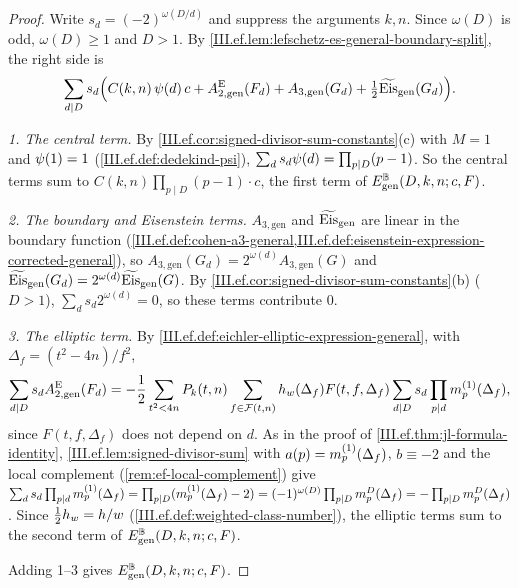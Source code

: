 \begin{theorem}
\end{theorem}
\begin{proof}
Write $s_d=(-2)^{\omega(D/d)}$ and suppress the arguments $k,n$. Since $\omega(D)$ is odd, $\omega(D)\ge1$ and $D>1$. By
\cref{III.ef.lem:lefschetz-es-general-boundary-split}, the right side is
\[
  \sum_{d\mid D}s_d\Bigl(C(k,n)\,\psi(d)\,c+A_{2,\mathrm{gen}}^{\mathrm E}(F_d)+A_{3,\mathrm{gen}}(G_d)+\tfrac12\widetilde{\mathrm{Eis}}_{\mathrm{gen}}(G_d)\Bigr).
\]

\emph{1. The central term.} By \cref{III.ef.cor:signed-divisor-sum-constants}(c) with $M=1$ and $\psi(1)=1$ (\cref{III.ef.def:dedekind-psi}),
$\sum_ds_d\psi(d)=\prod_{p\mid D}(p-1)$. So the central terms sum to $C(k,n)\prod_{p\mid D}(p-1)\cdot c$, the first term of
$E^{\mathbb{B}}_{\mathrm{gen}}(D,k,n;c,F)$.

\emph{2. The boundary and Eisenstein terms.} $A_{3,\mathrm{gen}}$ and $\widetilde{\mathrm{Eis}}_{\mathrm{gen}}$ are linear in the boundary function
(\cref{III.ef.def:cohen-a3-general,III.ef.def:eisenstein-expression-corrected-general}), so $A_{3,\mathrm{gen}}(G_d)=2^{\omega(d)}A_{3,\mathrm{gen}}(G)$ and
$\widetilde{\mathrm{Eis}}_{\mathrm{gen}}(G_d)=2^{\omega(d)}\widetilde{\mathrm{Eis}}_{\mathrm{gen}}(G)$. By \cref{III.ef.cor:signed-divisor-sum-constants}(b) ($D>1$), $\sum_ds_d2^{\omega(d)}=0$,
so these terms contribute $0$.

\emph{3. The elliptic term.} By \cref{III.ef.def:eichler-elliptic-expression-general}, with $\Delta_f=(t^2-4n)/f^2$,
\[
  \sum_{d\mid D}s_dA_{2,\mathrm{gen}}^{\mathrm E}(F_d)=-\frac12\sum_{t^2<4n}P_k(t,n)\sum_{f\in\mathcal{F}(t,n)}h_w(\Delta_f)F(t,f,\Delta_f)
  \sum_{d\mid D}s_d\prod_{p\mid d}m^{(1)}_p(\Delta_f),
\]
since $F(t,f,\Delta_f)$ does not depend on $d$. As in the proof of \cref{III.ef.thm:jl-formula-identity}, \cref{III.ef.lem:signed-divisor-sum} with
$a(p)=m^{(1)}_p(\Delta_f)$, $b\equiv-2$ and the local complement (\cref{rem:ef-local-complement}) give
$\sum_ds_d\prod_{p\mid d}m^{(1)}_p(\Delta_f)=\prod_{p\mid D}(m^{(1)}_p(\Delta_f)-2)=(-1)^{\omega(D)}\prod_{p\mid D}m^{D}_p(\Delta_f)=-\prod_{p\mid D}m^{D}_p(\Delta_f)$.
Since $\frac12h_w=h/w$ (\cref{III.ef.def:weighted-class-number}), the elliptic terms sum to the second term of $E^{\mathbb{B}}_{\mathrm{gen}}(D,k,n;c,F)$.

Adding 1--3 gives $E^{\mathbb{B}}_{\mathrm{gen}}(D,k,n;c,F)$.
\end{proof}
